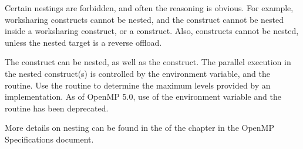 Certain nestings are forbidden, and often the reasoning is obvious.  For example, worksharing constructs cannot be nested, and
the  construct cannot be nested inside a worksharing construct, or a  construct. 
Also,  constructs cannot be nested, unless the nested target is a reverse offload.

The  construct can be nested, as well as the  construct.  
The parallel execution in the nested  construct(s) is controlled by the 
 environment variable, and the  routine. 
Use the  routine to determine the maximum levels provided by an implementation.
As of OpenMP 5.0, use of the  environment variable and the  routine 
has been deprecated.

More details on nesting can be found in the  of the  
chapter in the OpenMP Specifications document.


















